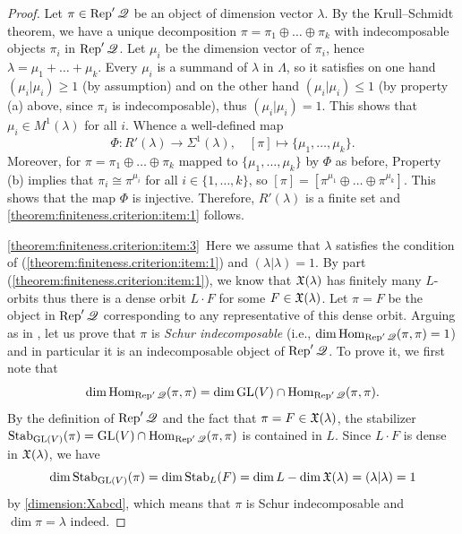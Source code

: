 \documentclass[12pt,reqno]{amsart}
\begin{document}
\begin{proof}
Let $\pi\in\Rep'\quiver$ be an object of dimension vector $\lambda$. By the Krull--Schmidt theorem, we have a unique decomposition $\pi=\pi_1\oplus\ldots\oplus\pi_k$ with indecomposable objects $\pi_i$ in $\Rep'\quiver$. Let $\mu_i$ be the dimension vector of $\pi_i$,
hence $\lambda=\mu_1+\ldots+\mu_k$. Every $\mu_i$
is a summand of $\lambda$ in $\Lambda$, so it satisfies on one hand $(\mu_i|\mu_i)\geq 1$ (by assumption) and on the other hand $(\mu_i|\mu_i)\leq 1$ (by property (a) above, since $\pi_i$ is indecomposable), thus $(\mu_i|\mu_i)=1$.
This shows that $\mu_i\in M^1(\lambda)$ for all $i$.
Whence a well-defined map
\begin{equation} \label{definition:Phi}
\Phi:R'(\lambda)\to\Sigma^1(\lambda),\quad [\pi]\mapsto \{\mu_1,\ldots,\mu_k\}.
\end{equation}
Moreover, for $\pi=\pi_1\oplus\ldots\oplus\pi_k$ mapped to $\{\mu_1,\ldots,\mu_k\}$ by $\Phi$ as before, Property (b) implies that
$\pi_i\cong \pi^{\mu_i}$ for all $i\in\{1,\ldots,k\}$, so
$[\pi]=[\pi^{\mu_1}\oplus\ldots\oplus \pi^{\mu_k}]$.
This shows that the map $\Phi$ is injective.
Therefore, $R'(\lambda)$ is a finite set and \eqref{theorem:finiteness.criterion:item:1} follows.

\eqref{theorem:finiteness.criterion:item:3}\
Here we assume that $\lambda$ satisfies the condition of (\ref{theorem:finiteness.criterion:item:1}) and $(\lambda|\lambda)=1$. By part (\ref{theorem:finiteness.criterion:item:1}), we know that $\mathfrak{X}(\lambda)$ has finitely many $L$-orbits thus there is a dense orbit $L\cdot F$ for some $ F \in \mathfrak{X}(\lambda) $.
Let $\pi=F$ be the object in $\Rep'\quiver$ corresponding to any representative of this dense orbit.
Arguing as in \cite[Proposition 3.2]{MWZ.1999},
let us prove that $\pi$ is \emph{Schur indecomposable}
(i.e., $\dim \Hom_{\Rep'\quiver}(\pi, \pi)=1$)
and in particular it is an indecomposable object of $\Rep'\quiver$.
To prove it, we first note that
%
\begin{equation*}
    \dim \Hom_{\Rep'\quiver}(\pi, \pi) = \dim \GL(V)\cap \Hom_{\Rep'\quiver}(\pi, \pi).
\end{equation*}
%
By the definition of $\Rep'\quiver$ and the fact that $\pi=F\in\mathfrak{X}(\lambda)$,
the stabilizer $ \Stab_{\GL(V)}(\pi)=\GL(V)\cap \Hom_{\Rep'\quiver}(\pi, \pi) $ is contained in $ L $.
Since $L\cdot F$ is dense in $ \mathfrak{X}(\lambda) $, we have
%
\begin{equation*}
    \dim \Stab_{\GL(V)}(\pi)
    = \dim \Stab_{L}(F) = \dim L - \dim \Xfv(\lambda) = (\lambda|\lambda) = 1
\end{equation*}
%
by \eqref{dimension:Xabcd},
which means that $ \pi $ is Schur indecomposable and $ \dim \pi = \lambda $ indeed.


\end{proof}
\end{document}
